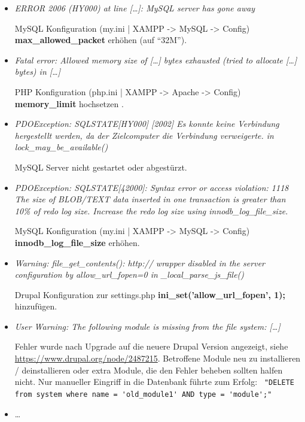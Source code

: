 \begin{itemize}[parsep=0pt, itemsep=5.0pt plus 2.0pt minus 1.0pt, leftmargin=*]
	\item \textit{ERROR 2006 (HY000) at line [\dots]: MySQL server has gone away}
	
	MySQL Konfiguration (my.ini | XAMPP -> MySQL -> Config)
	\textbf{max\_allowed\_packet} erhöhen (\zB auf \enquote{32M}).
	
	
	\item \textit{Fatal error: Allowed memory size of [\dots] bytes exhausted (tried to allocate [\dots] bytes) in [\dots]}
	
	PHP Konfiguration (php.ini | XAMPP -> Apache -> Config)
	\textbf{memory\_limit} hochsetzen .
	
	
	\item \textit{PDOException: SQLSTATE[HY000] [2002] Es konnte keine Verbindung hergestellt werden, da der Zielcomputer die Verbindung verweigerte. in lock\_may\_be\_available()}
	
	MySQL Server nicht gestartet oder abgestürzt.
	
	
	\item \textit{PDOException: SQLSTATE[42000]: Syntax error or access violation: 1118 The size of BLOB/TEXT data inserted in one transaction is greater than 10\% of redo log size. Increase the redo log size using innodb\_log\_file\_size.}
	
	MySQL Konfiguration (my.ini | XAMPP -> MySQL -> Config)
	\textbf{innodb\_log\_file\_size} erhöhen.
	
	
	\item \textit{Warning: file\_get\_contents(): http:// wrapper disabled in the server configuration by allow\_url\_fopen=0 in \_local\_parse\_js\_file()}
	
	Drupal Konfiguration zur settings.php \textbf{ini\_set('allow\_url\_fopen', 1);} hinzufügen.
	
	
	\item \textit{User Warning: The following module is missing from the file system: [\dots]}

	Fehler wurde nach Upgrade auf die neuere Drupal Version angezeigt, siehe \url{https://www.drupal.org/node/2487215}.
	Betroffene Module neu zu installieren / deinstallieren oder extra Module, die den Fehler beheben sollten halfen nicht. Nur manueller Eingriff in die Datenbank führte zum Erfolg: \lstinline| "DELETE from system where name = 'old_module1' AND type = 'module';"|
	
	\item \dots {}
\end{itemize}



